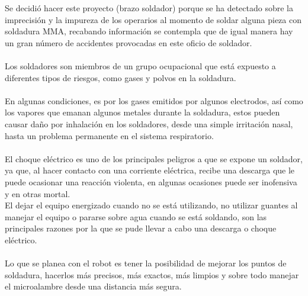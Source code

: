 \documentclass[12pt,letterpaper]{article}
\begin{document}
Se decidió hacer este proyecto (brazo soldador) porque se ha detectado sobre la imprecisión y la impureza de los operarios al momento de soldar alguna pieza con soldadura MMA, recabando información se contempla que de igual manera hay un gran número de accidentes provocadas en este oficio de soldador.
\\\\
Los soldadores son miembros de un grupo ocupacional que está expuesto a diferentes tipos de riesgos, como gases y polvos en la soldadura. 
\\\\
En algunas condiciones, es por los gases emitidos por algunos electrodos, así como los vapores que emanan algunos metales durante la soldadura, estos pueden causar daño por inhalación en los soldadores, desde una simple irritación nasal, hasta un problema permanente en el sistema respiratorio.
\\\\
El choque eléctrico es uno de los principales peligros a que se expone un soldador, ya que, al hacer contacto con una corriente eléctrica, recibe una descarga que le puede ocasionar una reacción violenta, en algunas ocasiones puede ser inofensiva y en otras mortal.
\\
El dejar el equipo energizado cuando no se está utilizando, no utilizar guantes al manejar el equipo o pararse sobre agua cuando se está soldando, son las principales razones por la que se pude llevar a cabo una descarga o choque eléctrico.
\\\\
Lo que se planea con el robot es tener la posibilidad de mejorar los puntos de soldadura, hacerlos más precisos, más exactos, más limpios y sobre todo manejar el microalambre desde una distancia más segura.

\newpage
\end{document}
